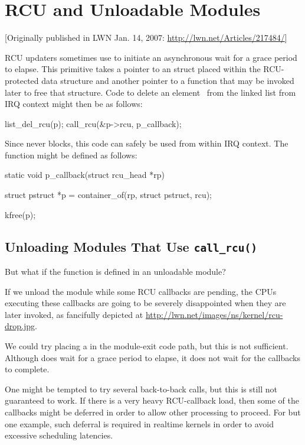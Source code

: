 \section{RCU and Unloadable Modules}
\label{sec:rcu:RCU and Unloadable Modules}

[Originally published in LWN Jan. 14, 2007: \url{http://lwn.net/Articles/217484/}]

RCU updaters sometimes use  to initiate an asynchronous wait for
a grace period to elapse.
This primitive takes a pointer to an 
struct placed within the RCU-protected data structure and another pointer
to a function that may be invoked later to free that structure.
Code to
delete an element~ from the linked list from IRQ context might then be
as follows:

\begin{VerbatimU}
	list_del_rcu(p);
	call_rcu(&p->rcu, p_callback);
\end{VerbatimU}

Since  never blocks, this code can safely be used from within
IRQ context.
The function  might be defined as follows:

\begin{VerbatimU}
	static void p_callback(struct rcu_head *rp)
	{
		struct pstruct *p = container_of(rp, struct pstruct, rcu);

		kfree(p);
	}
\end{VerbatimU}


\subsection{Unloading Modules That Use \texttt{call\_rcu()}}
\label{sec:rcu:Unloading Modules That Use call_rcu()}

But what if the  function is defined in an unloadable module?

If we unload the module while some RCU callbacks are pending,
the CPUs executing these callbacks are going to be severely
disappointed when they are later invoked, as fancifully depicted at
\url{http://lwn.net/images/ns/kernel/rcu-drop.jpg}.

We could try placing a  in the module-exit code path,
but this is not sufficient.
Although  does wait for a
grace period to elapse, it does not wait for the callbacks to complete.

One might be tempted to try several back-to-back 
calls, but this is still not guaranteed to work.
If there is a very
heavy RCU-callback load, then some of the callbacks might be deferred in
order to allow other processing to proceed.
For but one example, such
deferral is required in realtime kernels in order to avoid excessive
scheduling latencies.


